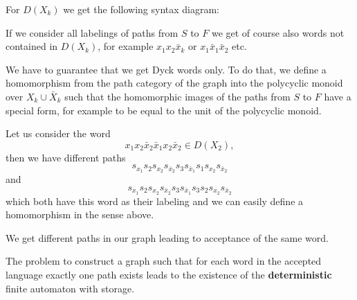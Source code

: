 For $D(X_k)$ we get the following syntax diagram:

\begin{center}
\end{center}

If we consider all labelings of paths from $S$ to $F$ we get of course also
words not contained in $D(X_k)$, for example $x_1 x_2 \bar{x}_k$ or $x_1
\bar{x}_1 \bar{x}_2$ etc.

We have to guarantee that we get Dyck words only. To do that, we define a
homomorphism from the path category of the graph into the polycyclic monoid over
$X_k \cup \bar{X}_k$ such that the homomorphic images of the paths from $S$ to
$F$ have a special form, for example to be equal to the unit of the
polycyclic monoid.

Let us consider the word
\[ x_1 x_2 \bar{x}_2 \bar{x}_1 x_2 \bar{x}_2 \in D(X_2), \]
then we have different paths
\[s_{x_1} s_2 s_{x_2} s_{\bar{x}_2} s_3 s_{\bar{x}_1} s_1
s_{x_2} s_{\bar{x}_2} \] 
and 
\[s_{x_1} s_2 s_{x_2} s_{\bar{x}_2} s_3
s_{\bar{x}_1} s_3 s_2 s_{x_2} s_{\bar{x}_2}\]
which both have this word as their labeling and we can easily define a
homomorphism in the sense above.

We get different paths in our graph leading to acceptance of the same word.

The problem to construct a graph such that for each word in the accepted
language exactly one path exists leads to the existence of the {\bf
deterministic} finite automaton with storage.
